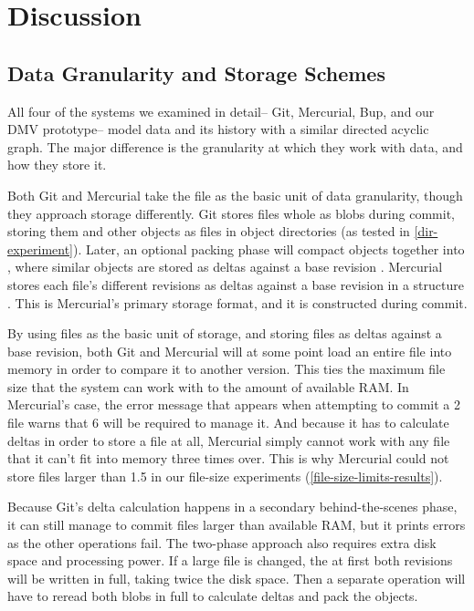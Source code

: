 \chapter{Discussion}


\section{Data Granularity and Storage Schemes}
\label{chunk-then-recombine}

All four of the systems we examined in detail-- Git, Mercurial, Bup, and our DMV
prototype-- model data and its history with a similar directed acyclic graph.
The major difference is the granularity at which they work with data, and how
they store it.

Both Git and Mercurial take the file as the basic unit of data granularity,
though they approach storage differently. Git stores files whole as blobs during
commit, storing them and other objects as files in object directories (as tested
in \autoref{dir-experiment}). Later, an optional packing phase will compact
objects together into , where similar objects are stored as
deltas against a base revision \cite[Section 10.4]{git_book}. Mercurial stores
each file's different revisions as deltas against a base revision in a
 structure \cite[Chapter 4]{hgbook}. This is Mercurial's
primary storage format, and it is constructed during commit.

By using files as the basic unit of storage, and storing files as deltas against
a base revision, both Git and Mercurial will at some point load an entire file
into memory in order to compare it to another version. This ties the maximum
file size that the system can work with to the amount of available RAM. In
Mercurial's case, the error message that appears when attempting to commit a
\SI{2}{\gib} file warns that \SI{6}{\gib} will be required to manage it. And
because it has to calculate deltas in order to store a file at all, Mercurial
simply cannot work with any file that it can't fit into memory three times over.
This is why Mercurial could not store files larger than \SI{1.5}{\gib} in our
file-size experiments (\autoref{file-size-limits-results}).

Because Git's delta calculation happens in a secondary behind-the-scenes phase,
it can still manage to commit files larger than available RAM, but it prints
errors as the other operations fail. The two-phase approach also requires extra
disk space and processing power. If a large file is changed, the at first both
revisions will be written in full, taking twice the disk space. Then a separate
operation will have to reread both blobs in full to calculate deltas and pack
the objects.

